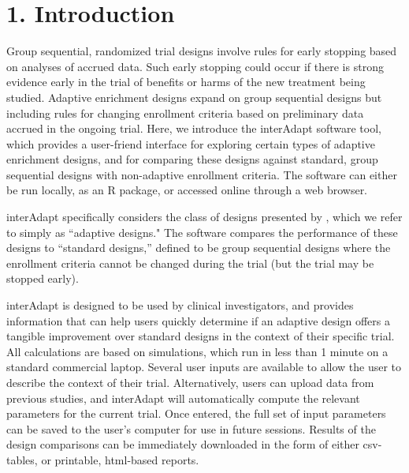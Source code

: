 \documentclass{article}
\newcommand{\interAdapt}{\textsf{interAdapt }}
\begin{document}
\section*{1. Introduction}
Group sequential, randomized trial designs involve rules for early stopping based on analyses of accrued data. Such early stopping could occur if there is strong evidence early in the trial of benefits or harms of the new treatment being studied. Adaptive enrichment designs expand on group sequential designs but including rules for changing enrollment criteria based on preliminary data accrued in the ongoing trial.
Here, we introduce the \interAdapt software tool, which provides a user-friend interface for exploring certain types of adaptive enrichment designs, and for comparing these designs against standard, group sequential designs with non-adaptive enrollment criteria. The software can either be run locally, as an R package, or accessed online through a web browser. 

\interAdapt specifically considers the class of designs presented by \cite{Rosenblum2013AdaptMISTIE}, which
we refer to simply as ``adaptive designs." The software compares the performance of these designs to ``standard designs,'' defined to  be group sequential designs where the enrollment criteria cannot be changed during the trial (but the trial may be stopped early). 

\interAdapt is designed to be used by clinical investigators, and provides information that can help users quickly determine if an adaptive design offers a tangible improvement over standard designs in the context of their specific trial. All calculations are based on simulations, which run in less than 1 minute on a standard commercial laptop. Several user inputs are available to allow the user to describe the context of their trial. Alternatively, users can upload data from previous studies, and \interAdapt will automatically compute the relevant parameters for the current trial. Once entered, the full set of input parameters can be saved to the user's computer for use in future sessions. Results of the design comparisons can be immediately downloaded in the form of either csv-tables, or printable, html-based reports.
\end{document}
